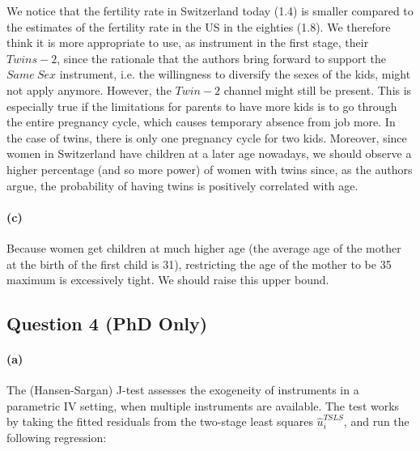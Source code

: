 \documentclass{scrartcl}
\begin{document}
We notice that the fertility rate in Switzerland today (1.4) is smaller compared to the estimates of the fertility rate in the US in the eighties (1.8). We therefore think it is more appropriate to use, as instrument in the first stage, their $Twins-2$, since the rationale that the authors bring forward to support the $Same\ Sex$ instrument, i.e. the willingness to diversify the sexes of the kids, might not apply anymore. However, the $Twin-2$ channel might still be present. This is especially true if the limitations for parents to have more kids is to go through the entire pregnancy cycle, which causes temporary absence from job more. In the case of twins, there is only one pregnancy cycle for two kids. Moreover, since women in Switzerland have children at a later age nowadays, we should observe a higher percentage (and so more power) of women with twins since, as the authors argue, the probability of having twins is positively correlated with age.

\paragraph*{(c)}

Because women get children at much higher age (the average age of the mother at the birth of the first child is 31), restricting the age of the mother to be 35 maximum is excessively tight. We should raise this upper bound.

\subsection*{Question 4 (PhD Only)}

\paragraph*{(a)}

The (Hansen-Sargan) J-test assesses the exogeneity of instruments in a parametric IV setting, when multiple instruments are available. The test works by taking the fitted residuals from the two-stage least squares $\hat{u}^{TSLS}_{i}$, and run the following regression: 
\end{document}
